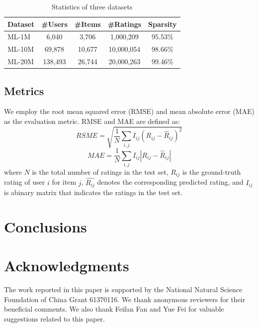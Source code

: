 \documentclass{sig-alternate-05-2015}
\begin{document}
\begin{table}[htpb]
	\centering
	\caption{Statistics of three datasets}
	\label{tab:statistics}
	\begin{tabular}{|l|c|c|c|c|}
		\hline
		\textbf{Dataset} & \textbf{\#Users} & \textbf{\#Items} & \textbf{\#Ratings} & \textbf{Sparsity} \\
		\hline
		ML-1M  & 6,040   & 3,706  & 1,000,209  & 95.53\% \\
		ML-10M & 69,878  & 10,677 & 10,000,054 & 98.66\% \\
		ML-20M & 138,493 & 26,744 & 20,000,263 & 99.46\% \\
		\hline
	\end{tabular}
\end{table}

\subsection{Metrics}
We employ the root mean squared error (RMSE) and mean absolute error (MAE) as the evaluation metric.
RMSE and MAE are defined as:
\begin{equation}
	RSME = \sqrt{ \frac{1}{N} \sum_{i,j} I_{ij} (R_{ij} - \hat{R}_{ij})^2 }
\end{equation}
\begin{equation}
	MAE = \frac{1}{N} \sum_{i,j} I_{ij} |R_{ij} - \hat{R}_{ij}|
\end{equation}
where $N$ is the total number of ratings in the test set,
$R_{ij}$ is the ground-truth rating of user $i$ for item $j$,
$\hat{R_{ij}}$ denotes the corresponding predicted rating,
and $I_{ij}$ is abinary matrix that indicates the ratings in the test set.




\section{Conclusions}


\section{Acknowledgments}
The work reported in this paper is supported by the National Natural Science Foundation of China Grant 61370116.
We thank anonymous reviewers for their beneficial comments.
We also thank Feifan Fan and Yue Fei for valuable suggestions related to this paper.



\end{document}
